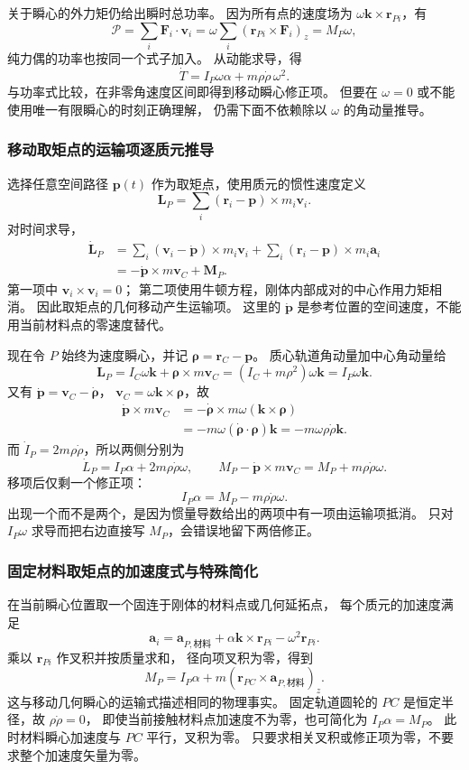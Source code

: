\documentclass[UTF8,zihao=-4,fontset=fandol,a4paper]{ctexart}
\newcommand{\vect}[1]{\bm{#1}}
\begin{document}
关于瞬心的外力矩仍给出瞬时总功率。
因为所有点的速度场为 $\omega\vect k\times\vect r_{Pi}$，有
\[
\mathcal P=\sum_i\vect F_i\cdot\vect v_i
=\omega\sum_i(\vect r_{Pi}\times\vect F_i)_z=M_P\omega,
\]
纯力偶的功率也按同一个式子加入。
从动能求导，得
\[
\dot T=I_P\omega\alpha+m\rho\dot\rho\,\omega^2.
\]
与功率式比较，在非零角速度区间即得到移动瞬心修正项。
但要在 $\omega=0$ 或不能使用唯一有限瞬心的时刻正确理解，
仍需下面不依赖除以 $\omega$ 的角动量推导。

\subsubsection*{移动取矩点的运输项逐质元推导}
选择任意空间路径 $\vect p(t)$ 作为取矩点，使用质元的惯性速度定义
\[
\vect L_P=\sum_i(\vect r_i-\vect p)\times m_i\vect v_i.
\]
对时间求导，
\begin{align*}
\dot{\vect L}_P
&=\sum_i(\vect v_i-\dot{\vect p})\times m_i\vect v_i
 +\sum_i(\vect r_i-\vect p)\times m_i\vect a_i\\
&=-\dot{\vect p}\times m\vect v_C+\vect M_P.
\end{align*}
第一项中 $\vect v_i\times\vect v_i=0$；
第二项使用牛顿方程，刚体内部成对的中心作用力矩相消。
因此取矩点的几何移动产生运输项。
这里的 $\dot{\vect p}$ 是参考位置的空间速度，不能用当前材料点的零速度替代。

现在令 $P$ 始终为速度瞬心，并记
$\vect\rho=\vect r_C-\vect p$。
质心轨道角动量加中心角动量给
\[
\vect L_P=I_C\omega\vect k+\vect\rho\times m\vect v_C
=(I_C+m\rho^2)\omega\vect k=I_P\omega\vect k.
\]
又有 $\dot{\vect p}=\vect v_C-\dot{\vect\rho}$，
$\vect v_C=\omega\vect k\times\vect\rho$，故
\begin{align*}
\dot{\vect p}\times m\vect v_C
&=-\dot{\vect\rho}\times m\omega(\vect k\times\vect\rho)\\
&=-m\omega(\dot{\vect\rho}\cdot\vect\rho)\vect k
=-m\omega\rho\dot\rho\vect k.
\end{align*}
而 $\dot I_P=2m\rho\dot\rho$，所以两侧分别为
\[
\dot L_P=I_P\alpha+2m\rho\dot\rho\omega,
\qquad M_P-\dot{\vect p}\times m\vect v_C
=M_P+m\rho\dot\rho\omega.
\]
移项后仅剩一个修正项：
\[
I_P\alpha=M_P-m\rho\dot\rho\omega.
\]
出现一个而不是两个，是因为惯量导数给出的两项中有一项由运输项抵消。
只对 $I_P\omega$ 求导而把右边直接写 $M_P$，会错误地留下两倍修正。

\subsubsection*{固定材料取矩点的加速度式与特殊简化}
在当前瞬心位置取一个固连于刚体的材料点或几何延拓点，
每个质元的加速度满足
\[
\vect a_i=\vect a_{P,\text{材料}}
+\alpha\vect k\times\vect r_{Pi}-\omega^2\vect r_{Pi}.
\]
乘以 $\vect r_{Pi}$ 作叉积并按质量求和，
径向项叉积为零，得到
\[
M_P=I_P\alpha+m(\vect r_{PC}\times\vect a_{P,\text{材料}})_z.
\]
这与移动几何瞬心的运输式描述相同的物理事实。
固定轨道圆轮的 $PC$ 是恒定半径，故 $\rho\dot\rho=0$，
即使当前接触材料点加速度不为零，也可简化为 $I_P\alpha=M_P$。
此时材料瞬心加速度与 $PC$ 平行，叉积为零。
只要求相关叉积或修正项为零，不要求整个加速度矢量为零。
\end{document}
